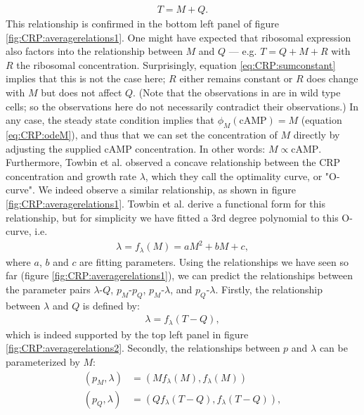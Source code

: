 \begin{align}
	\label{eq:CRP:sumconstant}	
	T = M + Q
	.
\end{align}
This relationship is confirmed in the bottom left panel of figure \ref{fig:CRP:averagerelations1}. 
One might have expected that ribosomal expression also factors into the relationship between $M$ and $Q$ --- e.g. $T=Q+M+R$ with $R$ the ribosomal concentration.
Surprisingly, equation \ref{eq:CRP:sumconstant} implies that this is not the case here; $R$ either remains constant or $R$ does change with $M$ but does not affect $Q$.
%
(Note that the observations in \cite{You2013} are in wild type cells; so the observations here do not necessarily contradict their observations.)
%
In any case, the steady state condition implies that $\phi_M(\text{cAMP}) = M$ (equation \ref{eq:CRP:odeM}), and thus that we can set the concentration of $M$ directly by adjusting the supplied cAMP concentration.
In other words: $M \propto \text{cAMP}$.
Furthermore, Towbin et al. \cite{Towbin2017} observed a concave relationship between the CRP concentration and growth rate $\lambda$, which they call the optimality curve, or "O-curve".
We indeed observe a similar relationship, as shown in figure \ref{fig:CRP:averagerelations1}. 
Towbin et al. derive a functional form for this relationship, but for simplicity we have fitted a 3rd degree polynomial to this O-curve, i.e.
\begin{align}
	\label{eq:CRP:muwithCRP}	
	\lambda = f_\lambda(M) = a M^2 + b M + c
	,
\end{align}
where $a$, $b$ and $c$ are fitting parameters.
%
Using the relationships we have seen so far (figure \ref{fig:CRP:averagerelations1}), 
we can predict the relationships between the parameter pairs 
$\lambda\text{-}Q$, $p_M\text{-}p_Q$, $p_M\text{-}\lambda$, and $p_Q\text{-}\lambda$.
%
Firstly, the relationship between $\lambda$ and $Q$ is defined by: 
\begin{align}
	\label{eq:CRP:muwithQ}	
	\lambda = f_\lambda(T-Q)
	,
\end{align}
which is indeed supported by the top left panel in figure \ref{fig:CRP:averagerelations2}.
%
Secondly, the relationships between $p$ and $\lambda$ can be parameterized by $M$: 
\begin{align}
	\label{eq:CRP:pmu}	
	\left(p_M, \lambda\right) & = \left(M f_\lambda(M), f_\lambda(M)\right) \nonumber \\ 
	\left(p_Q, \lambda\right) & = \left(Q f_\lambda(T-Q), f_\lambda(T-Q)\right)
	,
\end{align}
